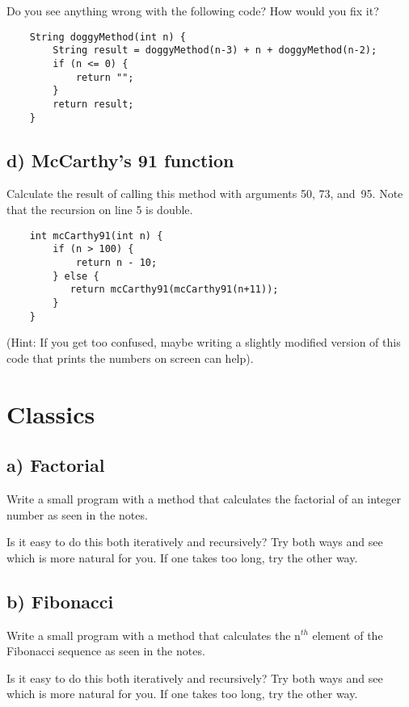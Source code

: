 \documentclass{article}
\begin{document}
Do you see anything wrong with the following code? How would you fix it?

\begin{verbatim}
    String doggyMethod(int n) {
        String result = doggyMethod(n-3) + n + doggyMethod(n-2);
        if (n <= 0) {
            return "";
        }
        return result;
    }
\end{verbatim}

\subsection*{d) McCarthy's 91 function}
\label{sec:c}

Calculate the result of calling this method with arguments 50, 73, 
and~95. Note that the recursion on line 5 is double. 

\begin{verbatim}
    int mcCarthy91(int n) {
        if (n > 100) {
            return n - 10;
        } else {
           return mcCarthy91(mcCarthy91(n+11));
        }
    }
\end{verbatim}

(Hint: If you get too confused, maybe writing a slightly modified
version of this code that prints the numbers on screen can help).

\section{Classics}

\subsection{a) Factorial }

Write a small program with a method that calculates the factorial of an
integer number as seen in the notes. 

Is it easy to do this both iteratively and recursively? Try both ways
and see which is more natural for you. If one takes too long, try the
other way. 

\subsection{b) Fibonacci }

Write a small program with a method that calculates the n$^{th}$ element
of the Fibonacci sequence as seen in the notes.

Is it easy to do this both iteratively and recursively? Try both ways
and see which is more natural for you. If one takes too long, try the
other way. 
\end{document}
